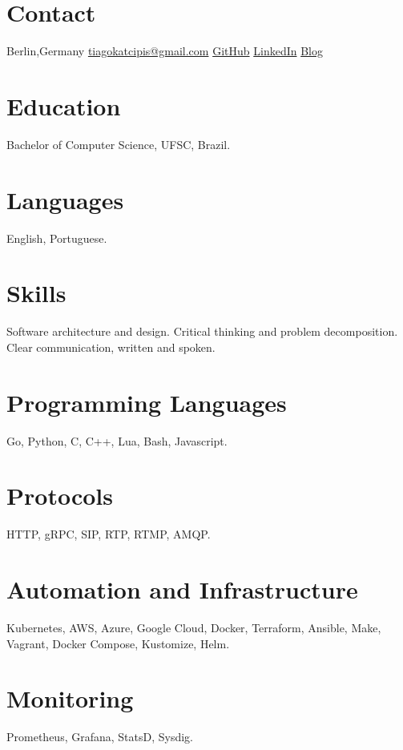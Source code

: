 \documentclass[]{friggeri-cv} %
\begin{document}


\begin{aside} %
\section{Contact}
Berlin,Germany
\href{mailto:tiagokatcipis@gmail.com}{tiagokatcipis@gmail.com}
\href{https://github.com/katcipis}{GitHub}
\href{http://www.linkedin.com/pub/tiago-katcipis/1b/273/8b0}{LinkedIn}
\href{http://katcipis.github.io/}{Blog}
\section{Education}
Bachelor of Computer Science, UFSC, Brazil.
\section{Languages}
English, Portuguese.
\section{Skills}
Software architecture and design.
Critical thinking and problem decomposition.
Clear communication, written and spoken.
\section{Programming Languages}
Go, Python, C, C++, Lua, Bash, Javascript.
\section{Protocols}
HTTP, gRPC, SIP, RTP, RTMP, AMQP.
\section{Automation and Infrastructure}
Kubernetes, AWS, Azure, Google Cloud, Docker, Terraform,
Ansible, Make, Vagrant, Docker Compose, Kustomize, Helm.
\section{Monitoring}
Prometheus, Grafana, StatsD, Sysdig.
\end{aside}
\end{document}
